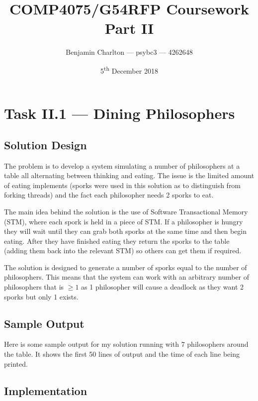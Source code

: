 \documentclass[a4paper]{article}
\title{COMP4075/G54RFP Coursework Part II}
\date{5\textsuperscript{th} December 2018}
\author{Benjamin Charlton --- psybc3 --- 4262648}
\begin{document}
\maketitle

\section{Task II.1 --- Dining Philosophers}

\subsection{Solution Design}
The problem is to develop a system simulating a number of philosophers at a table all alternating between thinking and eating.
The issue is the limited amount of eating implements (sporks were used in this solution as to distinguish from forking threads) and the fact each philosopher needs 2 sporks to eat.
\par
The main idea behind the solution is the use of Software Transactional Memory (STM), where each spork is held in a piece of STM\@.
If a philosopher is hungry they will wait until they can grab both sporks at the same time and then begin eating.
After they have finished eating they return the sporks to the table (adding them back into the relevant STM) so others can get them if required.
\par
The solution is designed to generate a number of sporks equal to the number of philosophers.
This means that the system can work with an arbitrary number of philosophers that is \( \ge 1\) as 1 philosopher will cause a deadlock as they want 2 sporks but only 1 exists.

\subsection{Sample Output}
Here is some sample output for my solution running with 7 philosophers around the table.
It shows the first 50 lines of output and the time of each line being printed.
\begin{center}
    \begin{multicols}{2}
        
    \end{multicols}
\end{center}

\subsection{Implementation}
\end{document}
